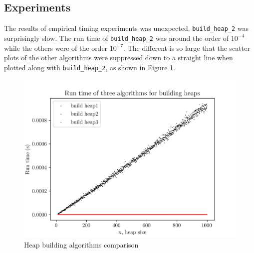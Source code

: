 \documentclass[titlepage, 12pt]{article}
\begin{document}
\subsection{Experiments}
\label{sec:experiment}

The results of empirical timing experiments was unexpected.
\texttt{build\_heap\_2} was surprisingly slow. The run time of
\texttt{build\_heap\_2} was around the order of \(10^{-4}\) while the others were
of the order \(10^{-7}\). The different is so large that the scatter plots of the
other algorithms were suppressed down to a straight line when plotted along with
\texttt{build\_heap\_2}, as shown in Figure \ref{fig:comp}.

\begin{figure}[h]
  \centering
  \includegraphics[width=\linewidth]{heap-comparison} 
  \caption{Heap building algorithms comparison}
  \label{fig:comp}
\end{figure}
\end{document}
